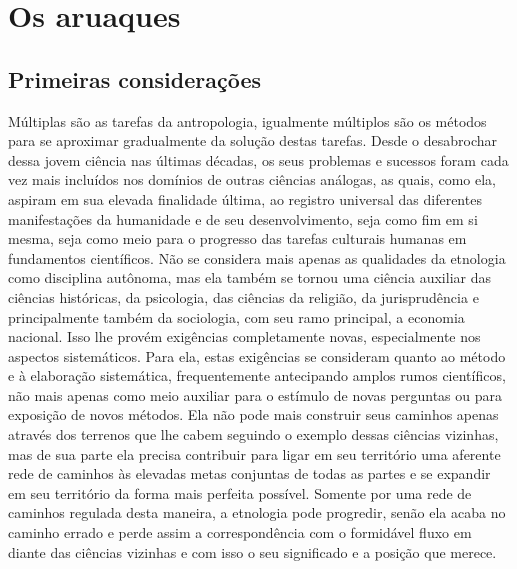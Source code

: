 

\part{Os aruaques}

\chapter*{Primeiras considerações\smallskip{}}

Múltiplas são as tarefas da antropologia, igualmente múltiplos são os
métodos para se aproximar gradualmente da solução destas tarefas. Desde
o desabrochar dessa jovem ciência nas últimas décadas, os seus problemas
e sucessos foram cada vez mais incluídos nos domínios de outras ciências
análogas, as quais, como ela, aspiram em sua elevada finalidade última,
ao registro universal das diferentes manifestações da humanidade e de
seu desenvolvimento, seja como fim em si mesma, seja como meio para o
progresso das tarefas culturais humanas em fundamentos científicos. Não
se considera mais apenas as qualidades da etnologia como disciplina
autônoma, mas ela também se tornou uma ciência auxiliar das ciências
históricas, da psicologia, das ciências da religião, da jurisprudência
e principalmente também da sociologia, com seu ramo principal, a
economia nacional. Isso lhe provém exigências completamente novas,
especialmente nos aspectos sistemáticos. Para ela, estas exigências se
consideram quanto ao método e à elaboração sistemática, frequentemente
antecipando amplos rumos científicos, não mais apenas como meio
auxiliar para o estímulo de novas perguntas ou para exposição de novos
métodos. Ela não pode mais construir seus caminhos apenas através dos
terrenos que lhe cabem seguindo o exemplo dessas ciências vizinhas, mas
de sua parte ela precisa contribuir para ligar em seu território uma
aferente rede de caminhos às elevadas metas conjuntas de todas as
partes e se expandir em seu território da forma mais perfeita possível.
Somente por uma rede de caminhos regulada desta maneira, a etnologia
pode progredir, senão ela acaba no caminho errado e perde assim a
correspondência com o formidável fluxo em diante das ciências vizinhas e
com isso o seu significado e a posição que merece.


